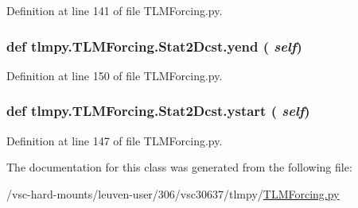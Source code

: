 Definition at line 141 of file TLMForcing.py.\hypertarget{classtlmpy_1_1TLMForcing_1_1Stat2Dcst_a2976544d34df0de8448985a3fedda290}{
\subsubsection[{yend}]{\setlength{\rightskip}{0pt plus 5cm}def tlmpy.TLMForcing.Stat2Dcst.yend ( {\em self})}}
\label{classtlmpy_1_1TLMForcing_1_1Stat2Dcst_a2976544d34df0de8448985a3fedda290}


Definition at line 150 of file TLMForcing.py.\hypertarget{classtlmpy_1_1TLMForcing_1_1Stat2Dcst_a43735c48479aa5943a63025156c58318}{
\subsubsection[{ystart}]{\setlength{\rightskip}{0pt plus 5cm}def tlmpy.TLMForcing.Stat2Dcst.ystart ( {\em self})}}
\label{classtlmpy_1_1TLMForcing_1_1Stat2Dcst_a43735c48479aa5943a63025156c58318}


Definition at line 147 of file TLMForcing.py.

The documentation for this class was generated from the following file:\begin{DoxyCompactItemize}
\item 
/vsc-\/hard-\/mounts/leuven-\/user/306/vsc30637/tlmpy/\hyperlink{TLMForcing_8py}{TLMForcing.py}\end{DoxyCompactItemize}
